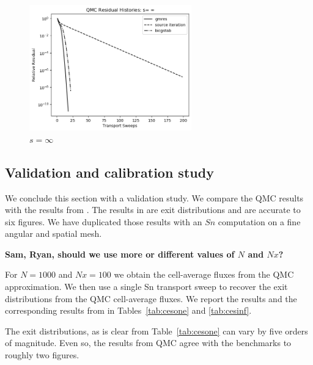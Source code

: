 \begin{figure}[h]
  \centering
  \includegraphics[trim = 10mm 0mm 15mm 15mm, width=70mm]{FIGURES/seqinf.png}
  \caption{$s = \infty$}
  \label{fig:hard}
\end{figure}

\clearpage

\subsection{Validation and calibration study}
\label{validation-and-calibration-study}

We conclude this section with a validation study. We compare the
QMC results with the results from \cite{cesinh}. The results
in \cite{cesinh} are exit distributions and are accurate to 
six figures. We have duplicated those results with an $Sn$ computation
on a fine angular and spatial mesh.

{\bf Sam, Ryan, should we use more or different values of $N$ and $Nx$?}

For $N = 1000$ and $Nx=100$ we obtain the cell-average fluxes from
the QMC approximation. We then use a single Sn transport sweep to recover
the exit distributions from the QMC cell-average fluxes. We report
the results and the corresponding results from \cite{cesinh} in 
Tables~\ref{tab:cesone} and \ref{tab:cesinf}.

The exit distributions, as is clear from Table~\ref{tab:cesone}
can vary by five orders of magnitude. Even so, the results from QMC
agree with the benchmarks to roughly two figures.

